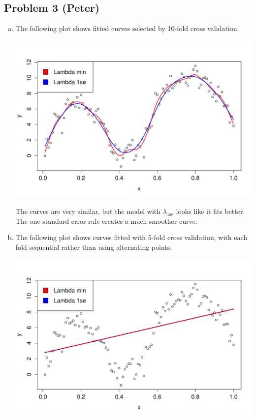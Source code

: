 \documentclass[12pt]{article}
\newcommand{\1}{\mathbbm{1}}
\begin{document}
\subsection{Problem 3 (Peter)}
\begin{enumerate}[(a)]
\item The following plot shows fitted curves selected by 10-fold cross validation.
\begin{center}
\includegraphics[width=5in]{prob3_a_1.pdf}
\end{center}
The curves are very similar, but the model with $\lambda_{1\text{se}}$ looks like it fits better. The one standard error rule creates a much smoother curve.
\item The following plot shows curves fitted with 5-fold cross validation, with each fold sequential rather than using alternating points.
\begin{center}
\includegraphics[width=5in]{prob3_b_1.pdf}
\end{center}

\end{enumerate}
\end{document}

